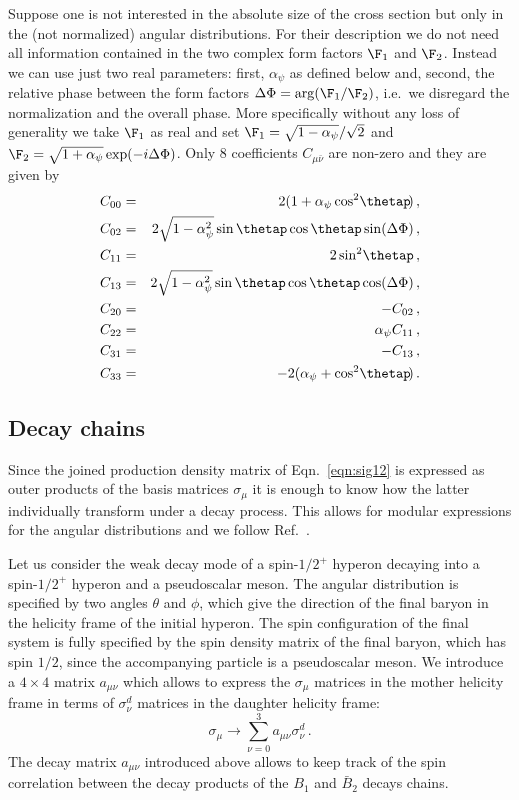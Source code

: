 Suppose one is not interested in the absolute size of the cross section but only in the 
(not normalized) angular distributions. For their description we do not need all information
contained in the two complex form factors $\F_1$ and $\F_2$. Instead we can use just two real
parameters: first, $\alpha_\psi$ as defined below and, second, the relative phase between the form
factors $\Delta\Phi=\arg(\F_1/\F_2)$, i.e.\ we disregard the normalization and 
the overall phase.  More specifically without any loss of generality we take $\F_1$ as
real and set $\F_1=\sqrt{1-\alpha_\psi}/\sqrt{2}$ and
$\F_2=\sqrt{1+\alpha_\psi}\exp(-i\Delta\Phi)$.
Only 8 coefficients $C_{\mu\bar\nu}$ are non-zero and they are given by
\begin{eqnarray}
C_{00}&=&2(1+\alpha_\psi\cos^2\!\thetap\!)   \,, \nonumber\\
C_{0 2}&=&2\sqrt{1-\alpha_\psi^2}\sin\thetap\cos\thetap\sin(\Delta\Phi)   \,, \nonumber\\
C_{1 1}&=&2\sin^2\!\thetap   \,, \nonumber\\
C_{1 3}&=&2\sqrt{1-\alpha_\psi^2}\sin\thetap\cos\thetap\cos(\Delta\Phi)   \,, \nonumber\\
C_{20}&=&-C_{0 2}   \,,\label{eqn:c1212} \\
C_{2 2}&=&\alpha_\psi C_{11}   \,, \nonumber\\
C_{3 1}&=&-C_{1 3}   \,, \nonumber\\
C_{3 3}&=&-2(\alpha_\psi+\cos^2\!\thetap\!)\, .\nonumber
\end{eqnarray}

 


 
\subsection{Decay chains}
\label{sec:decaychains}


Since the joined production density matrix of Eqn.~\eqref{eqn:sig12}
is expressed as outer products of the basis matrices $\sigma_\mu$ it
is enough to know how the latter individually transform under a decay
process. This allows for modular expressions for the 
angular distributions and we follow Ref.~\cite{Perotti:2018wxm}.

Let us consider the weak decay mode of a spin-$1/2^+$ hyperon decaying
into a spin-$1/2^+$
hyperon and a pseudoscalar meson. The angular distribution is specified by two angles $\theta$ and $\phi$, which give the direction of the
final baryon in the helicity frame of the initial hyperon.  The spin
configuration of the final system is fully specified by the spin density
matrix of the final baryon, which has spin $1/2$, since
the accompanying particle is a pseudoscalar meson.
We introduce 
a $4\times 4$ matrix $a_{\mu\nu}$ which allows to express the
$\sigma_\mu$ matrices in the mother helicity frame in terms of $\sigma_\nu^d$
matrices in the daughter helicity frame:  
\begin{equation}
\sigma_\mu\to\sum_{\nu=0}^3 a_{\mu\nu}\sigma_\nu^d\, . \label{eqn:decay12p}
\end{equation}
The decay matrix $a_{\mu\nu}$ introduced above 
allows to keep track of the spin correlation between the decay 
products of the $B_1$ and $\bar B_2$ decays chains.

